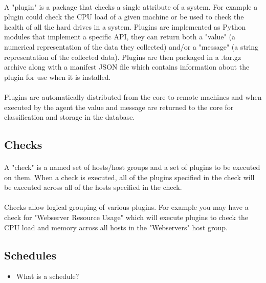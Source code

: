 \documentclass[bsc,logo,twoside]{infthesis}
\begin{document}
\paragraph*{}
	A "plugin" is a package that checks a single attribute of a system.  For
	example a plugin could check the CPU load of a given machine or be used 
	to check the health of all the hard drives in a system.  Plugins are
	implemented as Python modules that implement a specific API, they can return
	both a "value" (a numerical representation of the data they collected) and/or
	a "message" (a string representation of the collected data).  Plugins are
	then packaged in a .tar.gz archive along with a manifest JSON file which 
	contains information about the plugin for use when it is installed.
	
\paragraph*{}
	Plugins are automatically distributed from the core to remote machines and
	when executed by the agent the value and message are returned to the core for
	classification and storage in the database.

\subsection{Checks}
\paragraph*{}
	A "check" is a named set of hosts/host groups and a set of plugins to be
	executed on them.  When a check is executed, all of the plugins specified in
	the check will be executed across all of the hosts specified in the check.
	
\paragraph*{}
	Checks allow logical grouping of various plugins.  For example you may have a
	check for "Webserver Resource Usage" which will execute plugins to check the
	CPU load and memory across all hosts in the "Webservers" host group.

\subsection{Schedules}
\begin{itemize}
	\item What is a schedule?
\end{itemize}
\end{document}
